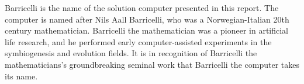 Barricelli is the name of the solution computer presented in this report.
The computer is named after Nils Aall Barricelli, who was a Norwegian-Italian 20th century mathematician.
Barricelli the mathematician was a pioneer in artificial life research, and he performed early computer-assisted experiments in the symbiogenesis and evolution fields.
It is in recognition of Barricelli the mathematicians's groundbreaking seminal work that Barricelli the computer takes its name.
\cite{barricelli-paper}
